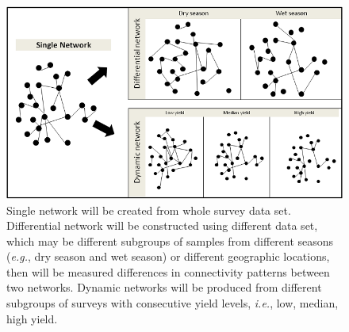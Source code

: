 \newpage
\begin{landscape}
\begin{figure}
\centering
\includegraphics[width=8in]{wholenet}
\caption[Network comparison]{Single network will be created from whole survey data set. Differential network will be constructed using different data set, which may be different subgroups of samples from different seasons (\textit{e.g.}, dry season and wet season) or different geographic locations, then will be measured differences in connectivity patterns between two networks. Dynamic networks will be produced from different subgroups of surveys with consecutive yield levels, \textit{i.e.}, low, median, high yield.}
\end{figure}
\end{landscape}

